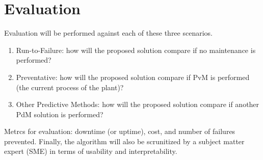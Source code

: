 \section{Evaluation}

Evaluation will be performed against each of these three scenarios.
\begin{enumerate}
    \item Run-to-Failure: how will the proposed solution compare if no maintenance is performed?
    \item Preventative: how will the proposed solution compare if PvM is performed (the current process of the plant)?
    \item Other Predictive Methods: how will the proposed solution compare if another PdM solution is performed?
\end{enumerate}

Metrcs for evaluation: downtime (or uptime), cost, and number of failures prevented.
Finally, the algorithm will also be scrunitized by a subject matter expert (SME) in terms of usability and interpretability.
